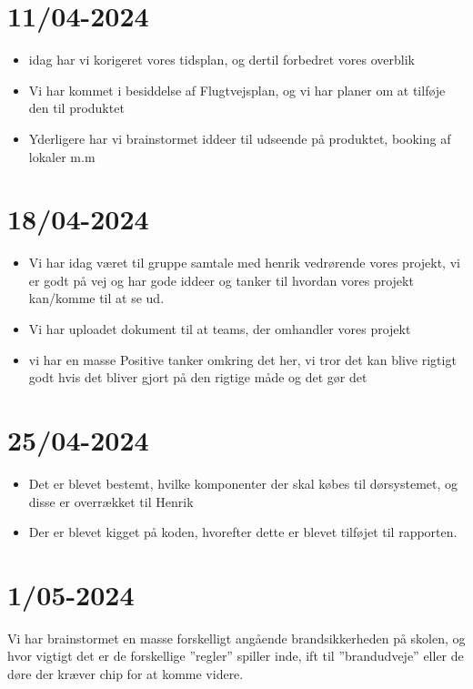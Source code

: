\documentclass[12pt, a4paper]{article}
\begin{document}
    \section{11/04-2024}
        \begin{itemize}
            \item idag har vi korigeret vores tidsplan, og dertil forbedret vores overblik
            \item Vi har kommet i besiddelse af Flugtvejsplan, og vi har planer om at tilføje den til produktet
            \item Yderligere har vi brainstormet iddeer til udseende på produktet, booking af lokaler m.m
        \end{itemize}

    \section{18/04-2024}
        \begin{itemize}
            \item Vi har idag været til gruppe samtale med henrik vedrørende vores projekt, vi er godt på vej og har gode iddeer og tanker til hvordan vores projekt kan/komme til at se ud.
            \item Vi har uploadet dokument til at teams, der omhandler vores projekt
            \item vi har en masse Positive tanker omkring det her, vi tror det kan blive rigtigt godt hvis det bliver gjort på den rigtige måde og det gør det
        \end{itemize}

    \section{25/04-2024}
        \begin{itemize}
            \item Det er  blevet bestemt, hvilke komponenter der skal købes til dørsystemet, og disse er overrækket til Henrik
            \item Der er blevet kigget på koden, hvorefter dette er blevet tilføjet til rapporten.
        \end{itemize}

    \section{1/05-2024}
    Vi har brainstormet en masse forskelligt angående brandsikkerheden på skolen, og hvor vigtigt det er
    de forskellige ”regler” spiller inde, ift til ”brandudveje” eller de døre der kræver chip for at komme
    videre.
\end{document}
